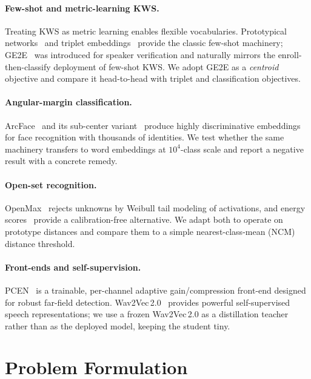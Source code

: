 \documentclass[10pt,twocolumn]{article}
\begin{document}
\paragraph{Few-shot and metric-learning KWS.}
Treating KWS as metric learning enables flexible vocabularies. Prototypical
networks~\cite{snell2017prototypical} and triplet
embeddings~\cite{schroff2015facenet} provide the classic few-shot machinery;
GE2E~\cite{wan2018ge2e} was introduced for speaker verification and naturally
mirrors the enroll-then-classify deployment of few-shot KWS. We adopt GE2E as a
\emph{centroid} objective and compare it head-to-head with triplet and
classification objectives.

\paragraph{Angular-margin classification.}
ArcFace~\cite{deng2019arcface} and its sub-center
variant~\cite{deng2020subcenter} produce highly discriminative embeddings for
face recognition with thousands of identities. We test whether the same
machinery transfers to word embeddings at $10^4$-class scale and report a
negative result with a concrete remedy.

\paragraph{Open-set recognition.}
OpenMax~\cite{bendale2016openmax} rejects unknowns by Weibull tail modeling of
activations, and energy scores~\cite{liu2020energy} provide a calibration-free
alternative. We adapt both to operate on prototype distances and compare them to
a simple nearest-class-mean (NCM) distance threshold.

\paragraph{Front-ends and self-supervision.}
PCEN~\cite{wang2017trainable} is a trainable, per-channel adaptive gain/compression
front-end designed for robust far-field detection. Wav2Vec\,2.0~\cite{baevski2020wav2vec}
provides powerful self-supervised speech representations; we use a frozen
Wav2Vec\,2.0 as a distillation teacher rather than as the deployed model, keeping
the student tiny.

\section{Problem Formulation}\label{sec:problem}
\end{document}
